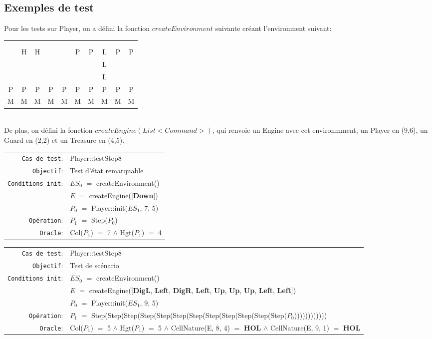 \documentclass{article}
\begin{document}
\subsection{Exemples de test}

Pour les tests sur Player, on a défini la fonction $createEnvironment$ suivante créant l'environment suivant:\\
\begin{tabular}{cccccccccc}
   & & & & & & & & & \\
   & & & & & & & & & \\
   &H&H& & &P&P&L&P&P\\
   & & & & & & &L& & \\
   & & & & & & &L& & \\
  P&P&P&P&P&P&P&P&P&P\\
  M&M&M&M&M&M&M&M&M&M
\end{tabular}\\
De plus, on défini la fonction $createEngine(List<Command>)$, qui renvoie un Engine avec cet environmment, un Player en (9,6), un Guard en (2,2) et un Treasure en (4,5).

{\small
  \begin{longtable}{rl}
    \texttt{Cas de test}: &\textrm{Player::testStep8}\\
    \texttt{Objectif}: & Test d'état remarquable \\
    \texttt{Conditions init}: & $ES_0$ $=$ \textrm{createEnvironment()}\\
    & $E$ $=$ \textrm{createEngine([\textbf{Down}])}\\
    & $P_0$ $=$ \textrm{Player::init($ES_1$, 7, 5)}\\
    \texttt{Opération}: &$P_1$ $=$ \textrm{Step($P_0$)}\\
    \texttt{Oracle}: &\textrm{Col($P_1$)} $=$ 7 $\land$ \textrm{Hgt($P_1$)} $=$ 4\\
  \end{longtable}}

{\small
  \begin{longtable}{rl}
    \texttt{Cas de test}: &\textrm{Player::testStep8}\\
    \texttt{Objectif}: & Test de scénario\\
    \texttt{Conditions init}: & $ES_0$ $=$ \textrm{createEnvironment()}\\
    & $E$ $=$ \textrm{createEngine([\textbf{DigL}, \textbf{Left}, \textbf{DigR}, \textbf{Left}, \textbf{Up}, \textbf{Up}, \textbf{Up}, \textbf{Left}, \textbf{Left}])}\\
    & $P_0$ $=$ \textrm{Player::init($ES_1$, 9, 5)}\\
    \texttt{Opération}: &$P_1$ $=$ \textrm{Step(Step(Step(Step(Step(Step(Step(Step(Step(Step(Step(Step($P_0$))))))))))))}\\
    \texttt{Oracle}: &\textrm{Col($P_1$)} $=$ 5 $\land$ \textrm{Hgt($P_1$)} $=$ 5 $\land$ \textrm{CellNature(E, 8, 4)} $=$ \textbf{HOL} $\land$ \textrm{CellNature(E, 9, 1)} $=$ \textbf{HOL}\\
  \end{longtable}}
\end{document}
